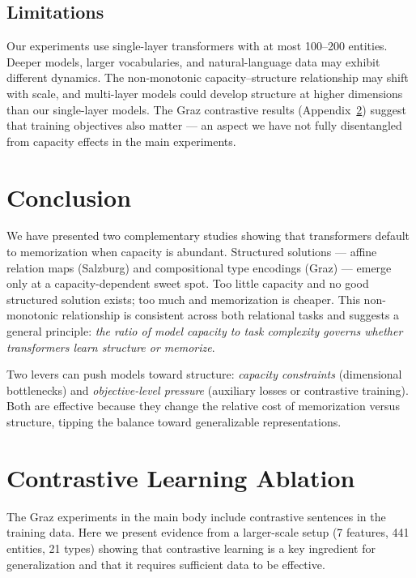 \documentclass[11pt]{article}
\begin{document}
\subsection{Limitations}

Our experiments use single-layer transformers with at most 100--200 entities.
Deeper models, larger vocabularies, and natural-language data may exhibit different
dynamics. The non-monotonic capacity--structure relationship may shift with scale, and
multi-layer models could develop structure at higher dimensions than our single-layer
models. The Graz contrastive results (Appendix~\ref{app:contrastive}) suggest that
training objectives also matter --- an aspect we have not fully disentangled from
capacity effects in the main experiments.

\section{Conclusion}

We have presented two complementary studies showing that transformers default to
memorization when capacity is abundant. Structured solutions --- affine relation maps
(Salzburg) and compositional type encodings (Graz) --- emerge only at a
capacity-dependent sweet spot. Too little capacity and no good structured solution
exists; too much and memorization is cheaper. This non-monotonic relationship is
consistent across both relational tasks and suggests a general principle:
\emph{the ratio of model capacity to task complexity governs whether transformers learn
structure or memorize}.

Two levers can push models toward structure: \emph{capacity constraints} (dimensional
bottlenecks) and \emph{objective-level pressure} (auxiliary losses or contrastive
training). Both are effective because they change the relative cost of memorization
versus structure, tipping the balance toward generalizable representations.

\appendix

\section{Contrastive Learning Ablation}
\label{app:contrastive}

The Graz experiments in the main body include contrastive sentences in the training
data. Here we present evidence from a larger-scale setup (7 features, 441 entities,
21 types) showing that contrastive learning is a key ingredient for generalization and
that it requires sufficient data to be effective.
\end{document}
